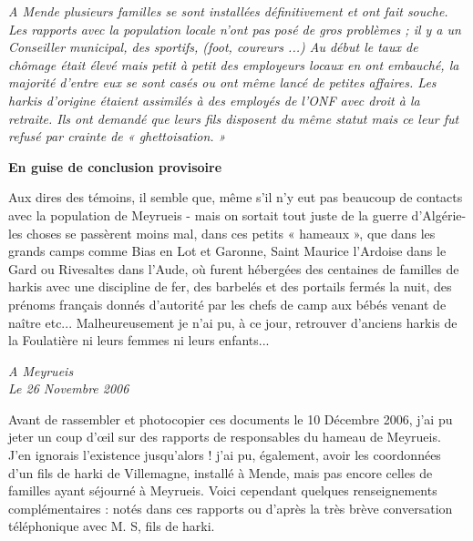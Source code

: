 \textit{A Mende plusieurs familles se sont installées définitivement et ont fait souche. Les
rapports avec la population locale n’ont pas posé de gros problèmes ; il y a un
Conseiller municipal, des sportifs, (foot, coureurs ...) Au début le taux de chômage
était élevé mais petit à petit des employeurs locaux en ont embauché, la majorité
d’entre eux se sont casés ou ont même lancé de petites affaires.
Les harkis d’origine étaient assimilés à des employés de l’ONF avec droit à la
retraite. Ils ont demandé que leurs fils disposent du même statut mais ce leur fut
refusé par crainte de « ghettoisation. »}

\begin{center}
\textbf{En guise de conclusion provisoire}
\end{center}

Aux dires des témoins, il semble que, même s’il n’y eut pas beaucoup de contacts
avec la population de Meyrueis - mais on sortait tout juste de la guerre d’Algérie- les
choses se passèrent moins mal, dans ces petits « hameaux », que dans les grands
camps comme Bias en Lot et Garonne, Saint Maurice l’Ardoise dans le Gard ou
Rivesaltes dans l’Aude, où furent hébergées des centaines de familles de harkis avec
une discipline de fer, des barbelés et des portails fermés la nuit, des prénoms français
donnés d’autorité par les chefs de camp aux bébés venant de naître etc...
Malheureusement je n’ai pu, à ce jour, retrouver d’anciens harkis de la Foulatière ni
leurs femmes ni leurs enfants...

\begin{flushright}
\textit{A Meyrueis\\
Le 26 Novembre 2006}
\end{flushright}

Avant de rassembler et photocopier ces documents le 10 Décembre 2006, j’ai pu jeter
un coup d’œil sur des rapports de responsables du hameau de Meyrueis. J’en ignorais
l’existence jusqu’alors ! j’ai pu, également, avoir les coordonnées d’un fils de harki
de Villemagne, installé à Mende, mais pas encore celles de familles ayant séjourné à
Meyrueis. Voici cependant quelques renseignements complémentaires : notés dans ces
rapports ou d’après la très brève conversation téléphonique avec M. S, fils de harki.



